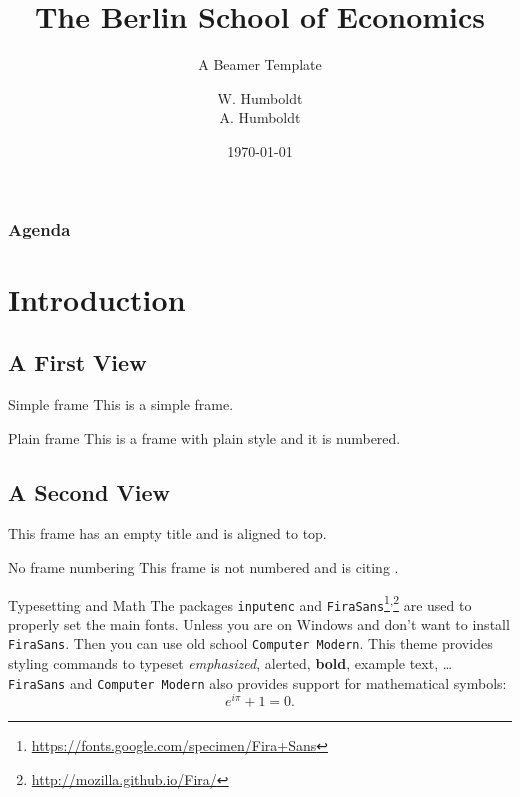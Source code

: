 \documentclass{beamer}
\title{The Berlin School of Economics}
\subtitle{A Beamer Template}
\author{W. Humboldt\texorpdfstring{\\}{,} A. Humboldt}
\institute{Berlin School of Economics}
\date{\today}
\begin{document}
    \begin{frame}
        \maketitle
    \end{frame}
    
    \begin{frame}[t]\frametitle{Agenda}
        \tableofcontents
    \end{frame}

    \section{Introduction}
    \subsection{A First View}
    \begin{frame}{Simple frame}
        This is a simple frame.
    \end{frame}

    \begin{frame}[plain]{Plain frame}
        This is a frame with plain style and it is numbered.
    \end{frame}
    
    \subsection{A Second View}
    \begin{frame}[t]
        This frame has an empty title and is aligned to top.
    \end{frame}
    
    \begin{frame}[noframenumbering]{No frame numbering}
        This frame is not numbered and is citing \cite{knuth74}.
    \end{frame}
    
    \begin{frame}{Typesetting and Math}
        The packages \texttt{inputenc} and \texttt{FiraSans}\footnote{\url{https://fonts.google.com/specimen/Fira+Sans}}\textsuperscript{,}\footnote{\url{http://mozilla.github.io/Fira/}} are used to properly set the main fonts. Unless you are on Windows and don't want to install \texttt{FiraSans}. Then you can use old school \texttt{Computer Modern}.
        \vfill
        This theme provides styling commands to typeset \emph{emphasized}, \alert{alerted}, \textbf{bold}, \textcolor{example}{example text}, \dots
        \vfill
        \texttt{FiraSans} and \texttt{Computer Modern} also provides support for mathematical symbols:
        \begin{equation*}
            e^{i\pi} + 1 = 0.
        \end{equation*}
    \end{frame}
\end{document}
